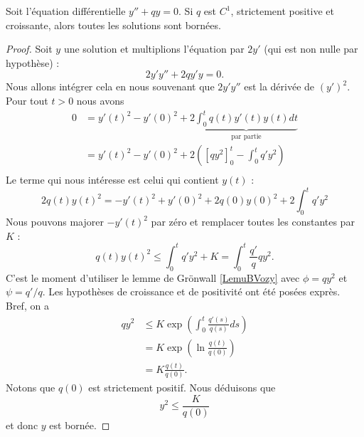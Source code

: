 \begin{proposition} \label{PropMYskGa}
    Soit l'équation différentielle \( y''+qy=0\). Si \( q\) est \( C^1\), strictement positive et croissante, alors toutes les solutions sont bornées.
\end{proposition}

\begin{proof}
    Soit \( y\) une solution et multiplions l'équation par \( 2y'\) (qui est non nulle par hypothèse) :
    \begin{equation}
        2y'y''+2qy'y=0.
    \end{equation}
    Nous allons intégrer cela en nous souvenant que \( 2y'y''\) est la dérivée de \( (y')^2\). Pour tout \( t>0\) nous avons
    \begin{subequations}
        \begin{align}
            0&=y'(t)^2-y'(0)^2+2\underbrace{\int_0^tq(t)y'(t)y(t)dt}_{\text{par partie}}\\
            &=y'(t)^2-y'(0)^2+2\left( [qy^2]_0^t-\int_0^tq'y^2 \right)\\
        \end{align}
    \end{subequations}
    Le terme qui nous intéresse est celui qui contient \( y(t)\) :
    \begin{equation}
        2q(t)y(t)^2=-y'(t)^2+y'(0)^2+2q(0)y(0)^2+2\int_0^t q'y^2
    \end{equation}
    Nous pouvons majorer \( -y'(t)^2\) par zéro et remplacer toutes les constantes par \( K\) :
    \begin{equation}
        q(t)y(t)^2\leq\int_0^tq'y^2+K=\int_0^t\frac{ q' }{ q }qy^2.
    \end{equation}
    C'est le moment d'utiliser le lemme de Grönwall \ref{LemuBVozy} avec \( \phi=qy^2\) et \( \psi=q'/q\). Les hypothèses de croissance et de positivité ont été posées exprès. Bref, on a
    \begin{subequations}
        \begin{align}
            qy^2&\leq K\exp\left( \int_0^t\frac{ q'(s) }{ q(s) }ds \right)\\
            &=K\exp\left( \ln\frac{ q(t) }{ q(0) } \right)\\
            &=K\frac{ q(t) }{ q(0) }.
        \end{align}
    \end{subequations}
    Notons que \( q(0)\) est strictement positif. Nous déduisons que
    \begin{equation}
        y^2\leq \frac{ K }{ q(0) }
    \end{equation}
    et donc \( y\) est bornée.
\end{proof}


